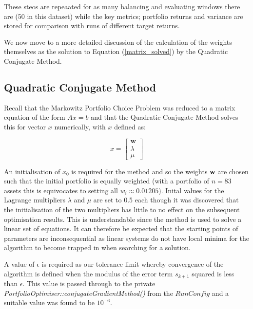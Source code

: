 \documentclass{article}
\begin{document}
These steos are repeaated for as many balancing and evaluating windows there are (50 in this dataset) while the key metrics; portfolio returns and variance are stored for comparison with runs of different target returns.


We now move to a more detailed discussion of the calculation of the weights themselves as the solution to Equation (\ref{matrix_solved}) by the Quadratic Conjugate Method.


\subsection{Quadratic Conjugate Method}
\label{sec:qcm}


Recall that the Markowitz Portfolio Choice Problem was reduced to a matrix equation of the form $Ax = b$ and that the Quadratic Conjugate Method solves this for vector $x$ numerically, with $x$ defined as:


\begin{equation}
x=
\begin{bmatrix}
\textbf{w}\\
\lambda \\
\mu
\end{bmatrix}
\end{equation}

An initialisation of $x_0$ is required for the method and so the weights \textbf{w} are chosen such that the initial portfolio is equally weighted (with a portfolio of $n = 83$ assets this is equivocates to setting all $w_i \approx 0.01205$). Inital values for the Lagrange multipliers $\lambda$ and $\mu$ are set to 0.5 each though it was discovered that the initialisation of the two multipliers has little to no effect on the subsequent optimisation results. This is understandable since the method is used to solve a linear set of equations. It can therefore be expected that the starting points of parameters are inconsequential as linear systems do not have local minima for the algorithm to become trapped in when searching for a solution.

A value of $\epsilon$ is required as our tolerance limit whereby convergence of the algorithm is defined when the modulus of the error term $s_{k+1}$ squared is less than $\epsilon$. This value is passed through to the private \textit{PortfolioOptimiser::conjugateGradientMethod()} from the $RunConfig$ and a suitable value was found to be $10^{-6}$.
\end{document}
